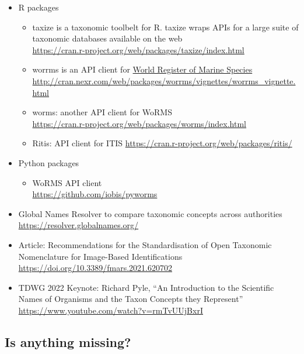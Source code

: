 \documentclass[
  oneside]{book}
\providecommand{\tightlist}{%
  \setlength{\itemsep}{0pt}\setlength{\parskip}{0pt}}
\begin{document}
\begin{itemize}
\tightlist
\item
  R packages

  \begin{itemize}
  \tightlist
  \item
    taxize is a taxonomic toolbelt for R. taxize wraps APIs for a large suite of taxonomic databases available on the web\\
    \url{https://cran.r-project.org/web/packages/taxize/index.html}
  \item
    worrms is an API client for \href{http://www.marinespecies.org/}{World Register of Marine Species}\\
    \url{http://cran.nexr.com/web/packages/worrms/vignettes/worrms_vignette.html}
  \item
    worms: another API client for WoRMS\\
    \url{https://cran.r-project.org/web/packages/worms/index.html}
  \item
    Ritis: API client for ITIS
    \url{https://cran.r-project.org/web/packages/ritis/}
  \end{itemize}
\item
  Python packages

  \begin{itemize}
  \tightlist
  \item
    WoRMS API client\\
    \url{https://github.com/iobis/pyworms}
  \end{itemize}
\item
  Global Names Resolver to compare taxonomic concepts across authorities\\
  \url{https://resolver.globalnames.org/}
\item
  Article: Recommendations for the Standardisation of Open Taxonomic Nomenclature for Image-Based Identifications\\
  \url{https://doi.org/10.3389/fmars.2021.620702}
\item
  TDWG 2022 Keynote: Richard Pyle, ``An Introduction to the Scientific Names of Organisms and the Taxon Concepts they Represent''\\
  \url{https://www.youtube.com/watch?v=rmTvUUjBxrI}
\end{itemize}

\hypertarget{is-anything-missing-1}{%
\subsection{Is anything missing?}\label{is-anything-missing-1}}
\end{document}
